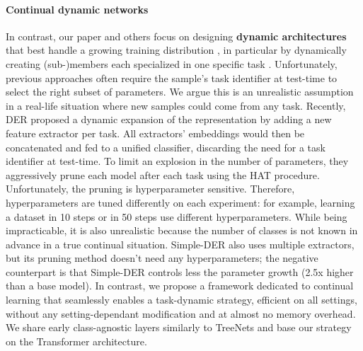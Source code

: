 \paragraph{Continual dynamic networks} In contrast, our paper and others focus on designing
\textbf{dynamic architectures} that best handle a growing training distribution
\cite{yoon2018dynamically_expandable_networks,li2019learning_to_grow}, in particular by dynamically
creating (sub-)members each specialized in one specific task
\cite{fernando2017path_net,golkar2019neural_pruning,
    hung2019cpg,rusu2016progressive,routingnetworkcollier,wen2020batchensemble}. Unfortunately, previous
approaches often require the sample's task identifier at test-time to select the right subset of
parameters. We argue this is an unrealistic assumption in a real-life situation where new samples
could come from any task.
Recently, DER \cite{yan2021der} proposed a dynamic expansion of the representation by adding a new
feature extractor per task. All extractors' embeddings would then be concatenated and fed to a
unified classifier, discarding the need for a task identifier at test-time. To limit an explosion in
the number of parameters, they aggressively prune each model after each task using the HAT
\cite{serra2018hat} procedure. Unfortunately, the pruning is hyperparameter sensitive. Therefore,
hyperparameters are tuned differently on each experiment: for example, learning a dataset in 10
steps or in 50 steps use different hyperparameters. While being impracticable, it is also
unrealistic because the number of classes is not known in advance in a true continual situation.
Simple-DER \cite{li2021preserve} also uses multiple extractors, but its pruning method doesn't need
any hyperparameters; the negative counterpart is that Simple-DER controls less the parameter growth
(2.5x higher than a base model). In contrast, we propose a framework dedicated to continual learning
that seamlessly enables a task-dynamic strategy, efficient on all settings, without any
setting-dependant modification and at almost no memory overhead. We share early class-agnostic
\cite{olah2017feature} layers similarly to TreeNets \cite{lee2015treenet} and base our strategy on
the Transformer architecture.

